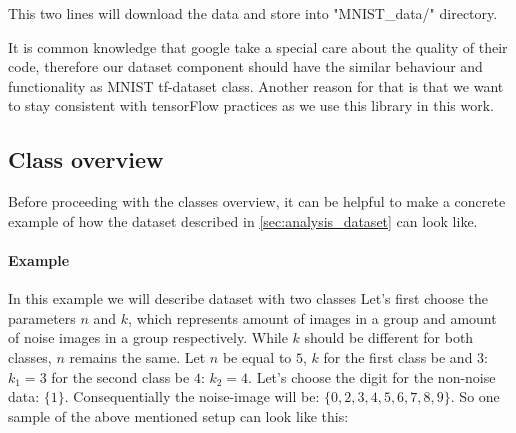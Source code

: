 This two lines will download the data and store into "MNIST_data/" directory.

It is common knowledge that google take a special care about the quality of their code,
therefore our dataset component should have the similar
behaviour and functionality as MNIST tf-dataset class. Another reason for that
is that we want to stay consistent with tensorFlow practices as we use this library
in this work.





\subsection{Class overview}

Before proceeding with the classes overview, it can be helpful
to make a concrete example of how the dataset described in
\autoref{sec:analysis_dataset} can look like.

\paragraph{Example} In this example we will describe dataset with two classes
Let's first choose the parameters $n$ and $k$,
which represents amount of images in a group and amount of noise images
in a group respectively. While $k$
should be different for both classes, $n$ remains the same.
Let $n$ be equal to $5$, $k$ for the first class be and $3$: $k_1 = 3$
for the second class be $4$: $k_2 = 4$. Let's choose the digit for the non-noise
data: $\{1\}$. Consequentially the noise-image will
be: $\{0, 2, 3, 4, 5, 6, 7, 8, 9\}$.
So one sample of the above mentioned setup can look like this:

